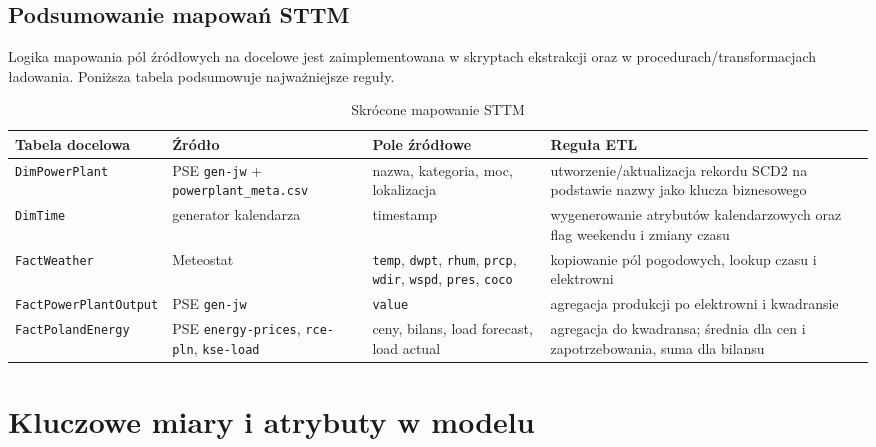 \documentclass[12pt]{article}
\begin{document}
	\subsection{Podsumowanie mapowań STTM}

	Logika mapowania pól źródłowych na docelowe jest zaimplementowana w skryptach ekstrakcji oraz w procedurach/transformacjach ładowania. Poniższa tabela podsumowuje najważniejsze reguły.

	\begin{table}[h!]
		\centering
		\small
		\begin{tabularx}{\textwidth}{|p{3.7cm}|p{3.6cm}|p{3.2cm}|X|}
			\hline
			\textbf{Tabela docelowa} & \textbf{Źródło} & \textbf{Pole źródłowe} & \textbf{Reguła ETL} \\
			\hline
			\texttt{DimPowerPlant} & PSE \texttt{gen-jw} + \texttt{powerplant\_meta.csv} & nazwa, kategoria, moc, lokalizacja & utworzenie/aktualizacja rekordu SCD2 na podstawie nazwy jako klucza biznesowego \\
			\hline
			\texttt{DimTime} & generator kalendarza & timestamp & wygenerowanie atrybutów kalendarzowych oraz flag weekendu i zmiany czasu \\
			\hline
			\texttt{FactWeather} & Meteostat & \texttt{temp}, \texttt{dwpt}, \texttt{rhum}, \texttt{prcp}, \texttt{wdir}, \texttt{wspd}, \texttt{pres}, \texttt{coco} & kopiowanie pól pogodowych, lookup czasu i elektrowni \\
			\hline
			\texttt{FactPowerPlantOutput} & PSE \texttt{gen-jw} & \texttt{value} & agregacja produkcji po elektrowni i kwadransie \\
			\hline
			\texttt{FactPolandEnergy} & PSE \texttt{energy-prices}, \texttt{rce-pln}, \texttt{kse-load} & ceny, bilans, load forecast, load actual & agregacja do kwadransa; średnia dla cen i zapotrzebowania, suma dla bilansu \\
			\hline
		\end{tabularx}
		\caption{Skrócone mapowanie STTM}
	\end{table}

	\newpage
	\section{Kluczowe miary i atrybuty w modelu}
\end{document}
